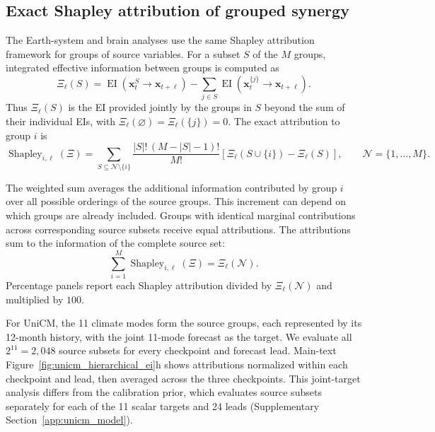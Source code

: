 \documentclass[fleqn,10pt]{wlscirep}
\begin{document}
\subsection{Exact Shapley attribution of grouped synergy}
\label{app:exact_shapley_attribution}


The Earth-system and brain analyses use the same Shapley attribution framework for groups of source variables. For a subset \(S\) of the \(M\) groups, integrated effective information between groups is computed as
\begin{equation}
\Xi_{\ell}(S)
=
\operatorname{EI}(\boldsymbol{x}_{t}^{S}\to\boldsymbol{x}_{t+\ell})
-
\sum_{j\in S}
\operatorname{EI}(\boldsymbol{x}_{t}^{\{j\}}\to\boldsymbol{x}_{t+\ell}).
\label{eq:shapley_value_function}
\end{equation}
Thus \(\Xi_{\ell}(S)\) is the EI provided jointly by the groups in \(S\) beyond the sum of their individual EIs, with \(\Xi_{\ell}(\varnothing)=\Xi_{\ell}(\{j\})=0\). The exact attribution to group \(i\) is
\begin{equation}
\operatorname{Shapley}_{i,\ell}(\Xi)
=
\sum_{S\subseteq\mathcal{N}\setminus\{i\}}
\frac{|S|!\,(M-|S|-1)!}{M!}
\left[
\Xi_{\ell}(S\cup\{i\})-\Xi_{\ell}(S)
\right],
\qquad \mathcal{N}=\{1,\ldots,M\}.
\label{eq:shapley_exact}
\end{equation}

The weighted sum averages the additional information contributed by group \(i\) over all possible orderings of the source groups. This increment can depend on which groups are already included. Groups with identical marginal contributions across corresponding source subsets receive equal attributions. The attributions sum to the information of the complete source set:
\begin{equation}
\sum_{i=1}^{M}\operatorname{Shapley}_{i,\ell}(\Xi)
=
\Xi_{\ell}(\mathcal{N}).
\label{eq:shapley_reporting}
\end{equation}
Percentage panels report each Shapley attribution divided by \(\Xi_{\ell}(\mathcal{N})\) and multiplied by \(100\).

For UniCM, the 11 climate modes form the source groups, each represented by its 12-month history, with the joint 11-mode forecast as the target. We evaluate all \(2^{11}=2{,}048\) source subsets for every checkpoint and forecast lead. Main-text Figure~\ref{fig:unicm_hierarchical_ei}h shows attributions normalized within each checkpoint and lead, then averaged across the three checkpoints. This joint-target analysis differs from the calibration prior, which evaluates source subsets separately for each of the 11 scalar targets and 24 leads (Supplementary Section~\ref{app:unicm_model}).
\end{document}

